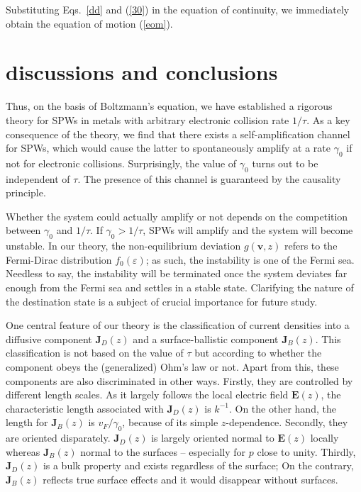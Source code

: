 \documentclass[aps,reprint]{revtex4-1}
\begin{document}
Substituting Eqs.~\ref{dd} and (\ref{30}) in the equation of continuity, we immediately obtain the equation of motion (\ref{eom}). 

\section{discussions and conclusions}
\label{sec:4}
Thus, on the basis of Boltzmann's equation, we have established a rigorous theory for SPWs in metals with arbitrary electronic collision rate $1/\tau$. As a key consequence of the theory, we find that there exists a self-amplification channel for SPWs, which would cause the latter to spontaneously amplify at a rate $\gamma_0$ if not for electronic collisions. Surprisingly, the value of $\gamma_0$ turns out to be independent of $\tau$. The presence of this channel is guaranteed by the causality principle.  

Whether the system could actually amplify or not depends on the competition between $\gamma_0$ and $1/\tau$. If $\gamma_0>1/\tau$, SPWs will amplify and the system will become unstable. In our theory, the non-equilibrium deviation $g(\mathbf{v},z)$ refers to the Fermi-Dirac distribution $f_0(\varepsilon)$; as such, the instability is one of the Fermi sea. Needless to say, the instability will be terminated once the system deviates far enough from the Fermi sea and settles in a stable state. Clarifying the nature of the destination state is a subject of crucial importance for future study. 

One central feature of our theory is the classification of current densities into a diffusive component $\mathbf{J}_D(z)$ and a surface-ballistic component $\mathbf{J}_B(z)$. This classification is not based on the value of $\tau$ but according to whether the component obeys the (generalized) Ohm's law or not. Apart from this, these components are also discriminated in other ways. Firstly, they are controlled by different length scales. As it largely follows the local electric field $\mathbf{E}(z)$, the characteristic length associated with $\mathbf{J}_D(z)$ is $k^{-1}$. On the other hand, the length for $\mathbf{J}_B(z)$ is $v_F/\gamma_0$, because of its simple $z$-dependence. Secondly, they are oriented disparately. $\mathbf{J}_D(z)$ is largely oriented normal to $\mathbf{E}(z)$ locally whereas $\mathbf{J}_B(z)$ normal to the surfaces -- especially for $p$ close to unity. Thirdly, $\mathbf{J}_D(z)$ is a bulk property and exists regardless of the surface; On the contrary, $\mathbf{J}_B(z)$ reflects true surface effects and it would disappear without surfaces. 
\end{document}
